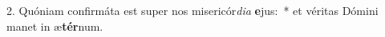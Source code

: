 2. Quóniam confirmáta est super nos misericór\textit{di}\textit{a} \textbf{e}jus:~*  et véritas Dómini manet in æ\textbf{tér}num.\


